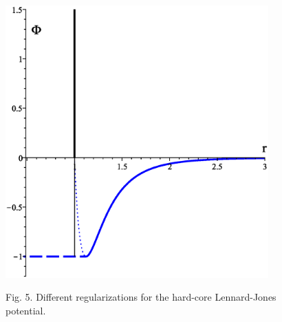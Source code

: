 \documentclass[8pt]{beamer}
\begin{document}
\begin{frame}
\begin{columns}
\begin{column}{0.4\textwidth}
				\begin{figure}[htbp]
					\includegraphics[width=0.9\textwidth,angle=0]{hclj_wca} \\
					\parbox{0.8\textwidth}{\caption*{Fig. 5. Different regularizations for the hard-core Lennard-Jones potential.
				}}
				\end{figure}				
			\end{column}
			
		\end{columns}
		
	\end{frame}
	
\end{document}
